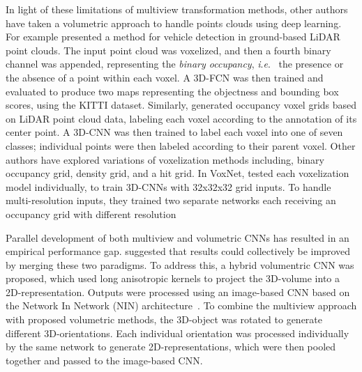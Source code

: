 \documentclass[final,3p,times,twocolumn,authoryear]{elsarticle}
\newcommand{\ie}{\textit{i}.\textit{e}.}
\begin{document}
In light of these limitations of multiview transformation methods, other authors have taken a volumetric approach to handle points clouds using deep learning. 
For example \citet{Bo_Li_iros} presented a method for vehicle detection in ground-based LiDAR point clouds. 
The input point cloud was voxelized, and then a fourth binary channel was appended, representing the \emph{binary occupancy}, \ie~ the presence or the absence of a point within each voxel. 
A 3D-FCN was then trained and evaluated to produce two maps representing the objectness and bounding box scores, using the KITTI dataset. 
Similarly, \citet{huang2016point} generated occupancy voxel grids based on LiDAR point cloud data, labeling each voxel according to the annotation of its center point. 
A 3D-CNN was then trained to label each voxel into one of seven classes; individual points were then labeled according to their parent voxel.  
Other authors have explored variations of voxelization methods including, binary occupancy grid, density grid, and a hit grid.  
In VoxNet, \citet{maturana2015voxnet} tested each voxelization model individually, to train 3D-CNNs with 32x32x32 grid inputs.
To handle multi-resolution inputs, they trained two separate networks each receiving an occupancy grid with different resolution

Parallel development of both multiview and volumetric CNNs has resulted in an empirical performance gap.
\citet{qi2016volumetric} suggested that results could collectively be improved by merging these two paradigms.
To address this, a hybrid volumentric CNN was proposed, which used long anisotropic kernels to project the 3D-volume into a 2D-representation.
Outputs were processed using an image-based CNN based on the Network In Network (NIN) architecture~\citep{NIN}. 
To combine the multiview approach with proposed volumetric methods, the 3D-object was rotated to generate different 3D-orientations. 
Each individual orientation was processed individually by the same network to generate 2D-representations, which were then pooled together and passed to the image-based CNN. 
\end{document}
